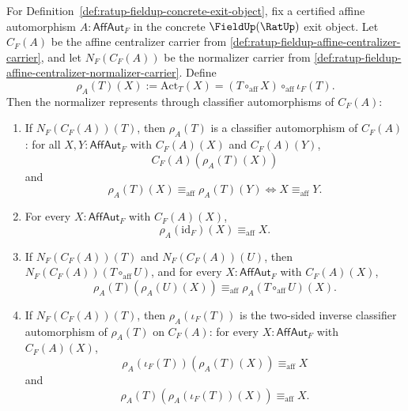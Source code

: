 \begin{theorem}
\label{thm:ratup-fieldup-affine-normalizer-representation}
For Definition~\ref{def:ratup-fieldup-concrete-exit-object}, fix a certified
affine automorphism $A:\mathsf{AffAut}_F$ in the concrete $\FieldUp(\RatUp)$
exit object. Let $C_F(A)$ be the affine centralizer carrier from
\autoref{def:ratup-fieldup-affine-centralizer-carrier}, and let
$N_F(C_F(A))$ be the normalizer carrier from
\autoref{def:ratup-fieldup-affine-centralizer-normalizer-carrier}. Define
$$
\rho_A(T)(X):=\mathrm{Act}_T(X)
=(T\circ_{\mathrm{aff}}X)\circ_{\mathrm{aff}}\iota_F(T).
$$
Then the normalizer represents through classifier automorphisms of $C_F(A)$:
\begin{enumerate}
\item If $N_F(C_F(A))(T)$, then $\rho_A(T)$ is a classifier automorphism of
$C_F(A)$: for all $X,Y:\mathsf{AffAut}_F$ with $C_F(A)(X)$ and $C_F(A)(Y)$,
$$
C_F(A)(\rho_A(T)(X))
$$
and
$$
\rho_A(T)(X)\equiv_{\mathrm{aff}}\rho_A(T)(Y)
\Longleftrightarrow X\equiv_{\mathrm{aff}}Y.
$$
\item For every $X:\mathsf{AffAut}_F$ with $C_F(A)(X)$,
$$
\rho_A(\mathrm{id}_F)(X)\equiv_{\mathrm{aff}}X.
$$
\item If $N_F(C_F(A))(T)$ and $N_F(C_F(A))(U)$, then
$N_F(C_F(A))(T\circ_{\mathrm{aff}}U)$, and for every $X:\mathsf{AffAut}_F$
with $C_F(A)(X)$,
$$
\rho_A(T)(\rho_A(U)(X))\equiv_{\mathrm{aff}}
\rho_A(T\circ_{\mathrm{aff}}U)(X).
$$
\item If $N_F(C_F(A))(T)$, then $\rho_A(\iota_F(T))$ is the two-sided inverse
classifier automorphism of $\rho_A(T)$ on $C_F(A)$: for every
$X:\mathsf{AffAut}_F$ with $C_F(A)(X)$,
$$
\rho_A(\iota_F(T))(\rho_A(T)(X))\equiv_{\mathrm{aff}}X
$$
and
$$
\rho_A(T)(\rho_A(\iota_F(T))(X))\equiv_{\mathrm{aff}}X.
$$
\end{enumerate}
\end{theorem}
